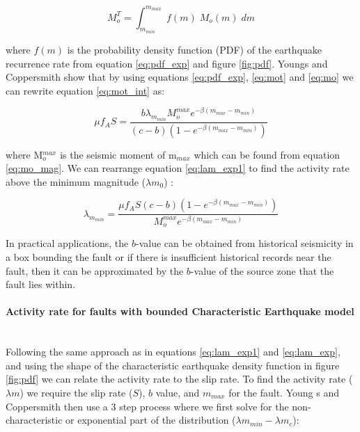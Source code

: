 \begin{enumerate}
\begin{equation} \label{eq:mot_int}
M_o^T = \int_{m_{min}}^{m_{max}} \; f(m) \; M_o(m) \; dm
\end{equation}

where $f(m)$ is the probability density function (PDF) of the earthquake recurrence rate from equation \ref{eq:pdf_exp} and figure \ref{fig:pdf}. 
Youngs and Coppersmith show that by using equations \ref{eq:pdf_exp}, \ref{eq:mot} and \ref{eq:mo} we can rewrite equation \ref{eq:mot_int} as:

\begin{equation} \label{eq:lam_exp1}
\mu f_A S= \frac{ b \lambda _{m_{min}} M_o^{max} e^{- \beta (m_{max} - m_{min} )} }  { (c - b) (1-e^{-\beta (m_{max} - m_{min}) })  }
\end{equation}

where M$_o^{max}$ is the seismic moment of m$_{max}$ which can be found from equation \ref{eq:mo_mag}. We can rearrange equation \ref{eq:lam_exp1} 
to find the activity rate above the minimum magnitude ($\lambda m_0$) :

\begin{equation} \label{eq:lam_exp}
\lambda _{m_{min}} = \frac{ \mu f_A S (c - b) (1-e^{-\beta (m_{max} - m_{min}) }) } { M_o^{max}  e^{- \beta (m_{max} - m_{min} )} }
\end{equation}

In practical applications, the $b$-value can be obtained from historical seismicity in a box bounding the fault \cite{schwartz1984,youngs1985} or if there is 
insufficient historical records near the fault, then it can be approximated by the $b$-value of the source zone that the fault lies within. 

\paragraph{Activity rate for faults with bounded Characteristic Earthquake model} 
\label{sec:rv_flt_ch}

\\ Following the same approach as in equations \ref{eq:lam_exp1} and  \ref{eq:lam_exp}, and using the shape of the characteristic 
earthquake density function in figure \ref{fig:pdf} we can relate the activity rate to the slip rate. To find the activity 
rate ($\lambda m$) we require the slip rate ($S$), $b$ value, and $m_{max}$ for the fault. Young s and Coppersmith then use 
a 3 step process where we first solve for the non-characteristic or exponential part of the distribution ($\lambda m_{min} - \lambda m_{c}$):


\end{enumerate}
